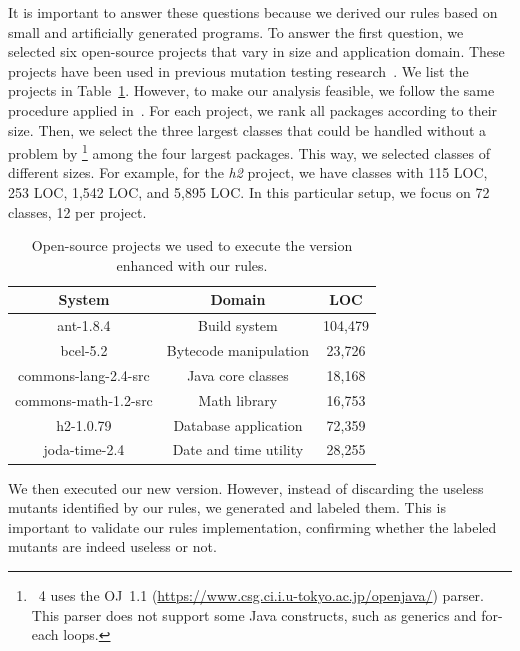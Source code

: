 It is important to answer these questions because we derived our rules based on small and artificially generated programs. 
To answer the first question, we selected six open-source projects that vary in size and application domain. 
These projects have been used in previous mutation testing research~\cite{KINTIS:2017:1, PAPADAKIS:2015:1, JUST:2014:1, KINTIS:2015:1}. 
We list the projects in Table~\ref{tab:systems}. 
However, to make our analysis feasible, we follow the same procedure applied in~\cite{KINTIS:2017:1}. 
For each project, we rank all packages according to their size. 
Then, we select the three largest classes that could be handled without a problem by \mujava{}\footnote{\mujava{}~4 uses the OJ~1.1 (\url{https://www.csg.ci.i.u-tokyo.ac.jp/openjava/}) parser. 
This parser does not support some Java constructs, such as generics and for-each loops.} among the four largest packages. 
This way, we selected classes of different sizes. 
For example, for the \textit{h2} project, we have classes with 115 LOC, 253 LOC, 1,542 LOC, and 5,895 LOC. In this particular setup, we focus on 72 classes, 12 per project. 


\scriptsize
\begin{table}
    \caption{Open-source projects we used to execute the \mujava{} version enhanced with our rules.}
    \centering
    \begin{tabular}{|c|c|c|}
    \hline
    \textbf{System} & \textbf{Domain} & \textbf{LOC} \\
    \hline
    ant-1.8.4 & Build system & 104,479 \\
    \hline
    bcel-5.2 & Bytecode manipulation & 23,726 \\
    \hline
    commons-lang-2.4-src & Java core classes & 18,168 \\
    \hline
    commons-math-1.2-src & Math library & 16,753 \\
    \hline
    h2-1.0.79 & Database application & 72,359 \\
    \hline
    joda-time-2.4 & Date and time utility & 28,255 \\
    \hline
    \end{tabular}
    \label{tab:systems}
\end{table}
\normalsize

We then executed our new \mujava{} version. 
However, instead of discarding the useless mutants identified by our rules, we generated and labeled them. 
This is important to validate our rules implementation, confirming whether the labeled mutants are indeed useless or not.

